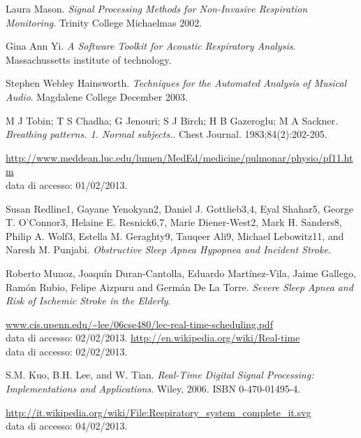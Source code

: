 \begin{thebibliography}{99}
  Laura Mason.
  \emph{Signal Processing Methods for Non-Invasive Respiration Monitoring}.
  Trinity College Michaelmas 2002.


  Gina Ann Yi.
  \emph{A Software Toolkit for Acoustic Respiratory Analysis}.
  Massachussetts institute of technology.

  Stephen Webley Hainsworth.
  \emph{Techniques for the Automated Analysis of Musical Audio}.
  Magdalene College December 2003.

  M J Tobin; T S Chadha; G Jenouri; S J Birch; H B Gazeroglu; M A Sackner.
  \emph{Breathing patterns. 1. Normal subjects.}.
  Chest Journal. 1983;84(2):202-205.

  \url{http://www.meddean.luc.edu/lumen/MedEd/medicine/pulmonar/physio/pf11.htm}\\
  data di accesso: 01/02/2013.

  Susan Redline1, Gayane Yenokyan2, Daniel J. Gottlieb3,4, Eyal Shahar5, George T. O'Connor3, Helaine E. Resnick6,7, Marie Diener-West2, Mark H. Sanders8, Philip A. Wolf3, Estella M. Geraghty9, Tauqeer Ali9, Michael Lebowitz11, and Naresh M. Punjabi.
  \emph{Obstructive Sleep Apnea Hypopnea and Incident Stroke}.

  Roberto Munoz, Joaqu\'in Duran-Cantolla, Eduardo Mart\'inez-Vila, Jaime Gallego, Ram\'on Rubio, Felipe Aizpuru and Germ\'an De La Torre.
  \emph{Severe Sleep Apnea and Risk of Ischemic Stroke in the Elderly}.


% 

  \url{www.cis.upenn.edu/~lee/06cse480/lec-real-time-scheduling.pdf}\\
  data di accesso: 02/02/2013.
  \url{http://en.wikipedia.org/wiki/Real-time}\\
  data di accesso: 02/02/2013.

  S.M. Kuo, B.H. Lee, and W. Tian.
  \emph{Real-Time Digital Signal Processing: Implementations and Applications}.
  Wiley, 2006. ISBN 0-470-01495-4.


  \url{http://it.wikipedia.org/wiki/File:Respiratory_system_complete_it.svg}\\
  data di accesso: 04/02/2013.


\end{thebibliography}
